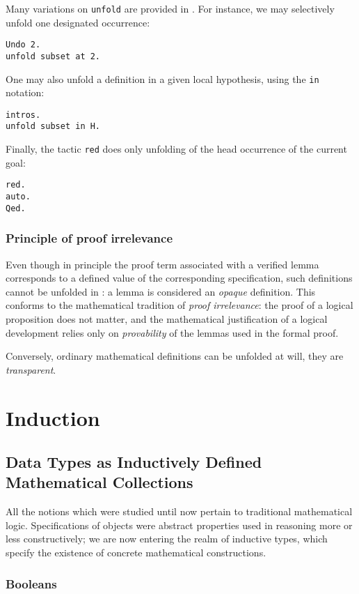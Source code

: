 \documentclass{book}
\begin{document}
Many variations on \verb:unfold: are provided in \Coq. For instance,
we may selectively unfold one designated occurrence:
\begin{lstlisting}
Undo 2.
unfold subset at 2.
\end{lstlisting}

One may also unfold a definition in a given local hypothesis, using the
\verb:in: notation:
\begin{lstlisting}
intros.
unfold subset in H.
\end{lstlisting}

Finally, the tactic \verb:red: does only unfolding of the head occurrence
of the current goal:
\begin{lstlisting}
red.
auto.
Qed.
\end{lstlisting}


\subsection{Principle of proof irrelevance}

Even though in principle the proof term associated with a verified lemma
corresponds to a defined value of the corresponding specification, such
definitions cannot be unfolded in \Coq: a lemma is considered an {\sl opaque}
definition. This conforms to the mathematical tradition of {\sl proof
irrelevance}: the proof of a logical proposition does not matter, and the
mathematical justification of a logical development relies only on
{\sl provability} of the lemmas used in the formal proof. 

Conversely, ordinary mathematical definitions can be unfolded at will, they
are {\sl transparent}. 
\chapter{Induction}

\section{Data Types as Inductively Defined Mathematical Collections}

All the notions which were studied until now pertain to traditional
mathematical logic. Specifications of objects were abstract properties
used in reasoning more or less constructively; we are now entering
the realm of inductive types, which specify the existence of concrete
mathematical constructions.

\subsection{Booleans}
\end{document}
